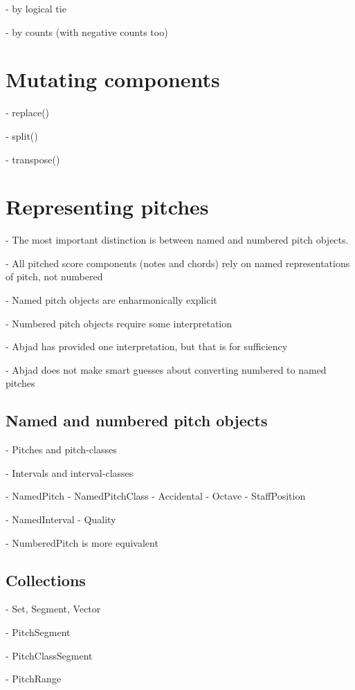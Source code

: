     -   by logical tie

    -   by counts (with negative counts too)

\section{Mutating components}

-   replace()

-   split()

-   transpose()

\section{Representing pitches}

-   The most important distinction is between named and numbered pitch
    objects.

-   All pitched score components (notes and chords) rely on named
    representations of pitch, not numbered

-   Named pitch objects are enharmonically explicit

-   Numbered pitch objects require some interpretation

-   Abjad has provided one interpretation, but that is for sufficiency

-   Abjad does not make smart guesses about converting numbered to named
    pitches

\subsection{Named and numbered pitch objects}

-   Pitches and pitch-classes

-   Intervals and interval-classes

-   NamedPitch
    -   NamedPitchClass
    -   Accidental
    -   Octave
    -   StaffPosition

-   NamedInterval
    -   Quality

-   NumberedPitch is more equivalent

\subsection{Collections}

-   Set, Segment, Vector

-   PitchSegment

-   PitchClassSegment

-   PitchRange

